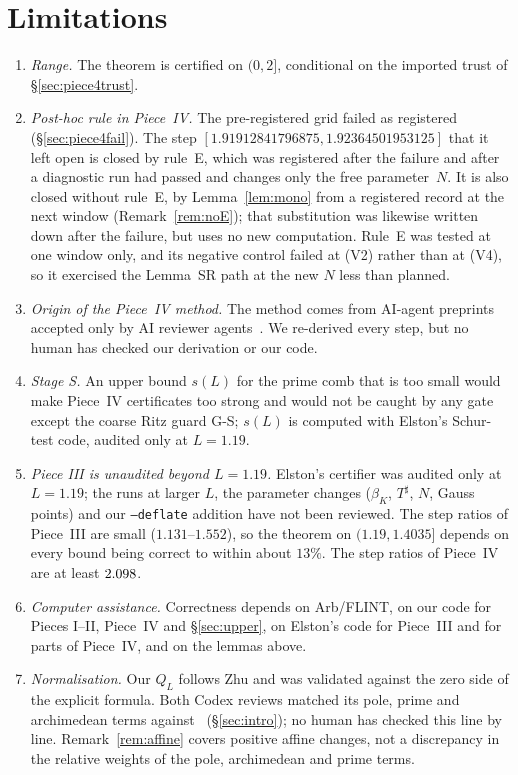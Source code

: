 \documentclass[11pt]{amsart}
\newcommand{\Lmax}{2}                                     %
\newcommand{\Tsh}{T^{\sharp}}
\theoremstyle{definition}
\theoremstyle{remark}
\numberwithin{equation}{section}
\begin{document}
\section{Limitations}\label{sec:limitations}
\begin{enumerate}
\item \emph{Range.} The theorem is certified on $(0,\Lmax]$, conditional on the imported trust of \S\ref{sec:piece4trust}.
\item \emph{Post-hoc rule in Piece~IV.} The pre-registered grid failed as registered (\S\ref{sec:piece4fail}). The step $[1.91912841796875,1.92364501953125]$ that it left open is closed by rule~E, which was registered after the failure and after a diagnostic run had passed and changes only the free parameter~$N$. It is also closed without rule~E, by Lemma~\ref{lem:mono} from a registered record at the next window (Remark~\ref{rem:noE}); that substitution was likewise written down after the failure, but uses no new computation. Rule~E was tested at one window only, and its negative control failed at (V2) rather than at (V4), so it exercised the Lemma~SR path at the new $N$ less than planned.
\item \emph{Origin of the Piece~IV method.} The method comes from AI-agent preprints accepted only by AI reviewer agents~\cite{rh45,rh60}. We re-derived every step, but no human has checked our derivation or our code.
\item \emph{Stage S.} An upper bound $s(L)$ for the prime comb that is too small would make Piece~IV certificates too strong and would not be caught by any gate except the coarse Ritz guard G-S; $s(L)$ is computed with Elston's Schur-test code, audited only at $L=1.19$.
\item \emph{Piece III is unaudited beyond $L=1.19$.} Elston's certifier was audited only at $L=1.19$; the runs at larger $L$, the parameter changes ($\beta_K$, $\Tsh$, $N$, Gauss points) and our \texttt{--deflate} addition have not been reviewed. The step ratios of Piece~III are small ($1.131$--$1.552$), so the theorem on $(1.19,1.4035]$ depends on every bound being correct to within about $13\%$. The step ratios of Piece~IV are at least $2.098$.
\item \emph{Computer assistance.} Correctness depends on Arb/FLINT, on our code for Pieces I--II, Piece~IV and \S\ref{sec:upper}, on Elston's code for Piece~III and for parts of Piece~IV, and on the lemmas above.
\item \emph{Normalisation.} Our $Q_L$ follows Zhu and was validated against the zero side of the explicit formula. Both Codex reviews matched its pole, prime and archimedean terms against~\cite[(3.7)--(3.11)]{CCM25} (\S\ref{sec:intro}); no human has checked this line by line. Remark~\ref{rem:affine} covers positive affine changes, not a discrepancy in the relative weights of the pole, archimedean and prime terms.

\end{enumerate}
\end{document}
